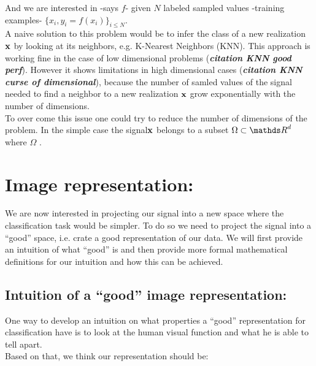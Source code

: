 \documentclass[a4paper,11pt]{report}
\begin{document}
		And we are interested in  -says $f$- given $N$ labeled sampled values -training examples- $\{x_{i}, y_{i}=f(x_{i})\}_{i\leq N}$.\\
		
		A naive solution to this problem would be to infer the class of a new realization ${\bf x}$ by looking at its neighbors, e.g. K-Nearest Neighbors (KNN). This approach is working fine in the case of low dimensional problems (\textbf{\textit{citation KNN good perf}}). However it shows limitations in high dimensional cases (\textbf{\textit{citation KNN curse of dimensional}}), because the number of samled values of the signal needed to find a neighbor to a new realization ${\bf x}$ grow exponentially with the number of dimensions.\\
			
		To over come this issue one could try to reduce the number of dimensions of the problem. In the simple case the signal${\bf x}$ belongs to a subset $\Omega \subset \dsR^{d}$ where $\Omega$ .
		
		
	\section{Image representation:}
		\label{seq:Intro/Image rep}
		We are now interested in projecting our signal into a new space where the classification task would be simpler. To do so we need to project the signal into a ``good'' space, i.e. crate a good representation of our data. We will first provide an intuition of what ``good'' is and then provide more formal mathematical definitions for our intuition and how this can be achieved.
%     
		\subsection{Intuition of a ``good'' image representation:}
      \label{seq:Intro/Image rep/Intuition}
      One way to develop an intuition on what properties a ``good'' representation for classification have is to look at the human visual function and what he is able to tell apart.\\
      
      Based on that, we think our representation should be:
      
\end{document}
